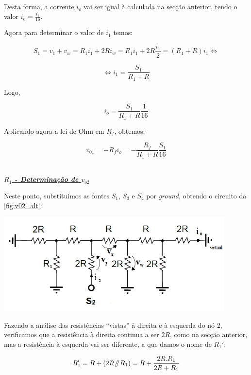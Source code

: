 \documentclass[a4paper,11pt]{report}
\newcommand{\parallelsum}{\mathbin{\!/\mkern-5mu/\!}} %
\begin{document}
Desta forma, a corrente $i_o$ vai ser igual à calculada na secção anterior, tendo o valor $i_o=\frac{i_1}{16}$.

Agora para determinar o valor de $i_1$ temos:

$$S_1=v_1+v_w=R_1 i_1+2R i_w=R_1 i_1 +2R \frac{i_1}{2}=\left(R_1+R\right)i_1\Leftrightarrow $$

$$\Leftrightarrow i_1=\frac{S_1}{R_1+R}$$

Logo,

$$i_o=\frac{S_1}{R_1+R}\frac{1}{16}$$

Aplicando agora a lei de Ohm em $R_f$, obtemos:

\begin{equation}\label{eq:v01_1}
v_{01}=-R_fi_o=-\frac{R_f}{R_1+R}\frac{S_1}{16}
\end{equation}\\

\par

\large\underline{\textit{\textbf{$R_1$ - Determinação de $v_{o2}$}}}\\
\par

Neste ponto, substituímos as fontes $S_1$,  $S_3$ e $S_4$ por \textit{ground}, obtendo o circuito da \ref{fig:v02_alt}:

\begin{center}
     \includegraphics[angle=0,width=0.9\textwidth]{v02_alt.png}
     \label{fig:v02_alt}
     \end{center}

Fazendo a análise das resistências ``vistas'' à direita e à esquerda do nó 2, verificamos que a resistência à direita continua a ser $2R$, como na secção anterior, mas a resistência à esquerda vai ser diferente, a que damos o nome de $R_1'$:

$$R_1'=R+\left(2R\parallelsum R_1\right)=R+\frac{2R.R_1}{2R+R_1}$$
\end{document}
